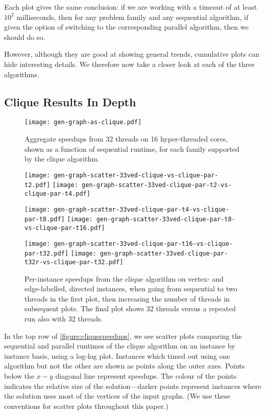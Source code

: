 \documentclass[sigconf]{acmart}
\begin{document}
Each plot gives the same conclusion: if we are working with a timeout of at least $10^2$
milliseconds, then for any problem family and any sequential algorithm, if given the option of
switching to the corresponding parallel algorithm, then we should do so.

However, although they are good at showing general trends, cumulative plots can hide interesting
details. We therefore now take a closer look at each of the three algorithms.

\subsection{Clique Results In Depth}

\begin{figure}[p]
    \texttt{[image: gen-graph-as-clique.pdf]}

    \caption{Aggregate speedups from 32 threads on 16 hyper-threaded cores, shown as a function of
    sequential runtime, for each family supported by the clique algorithm.}\label{figure:cliqueas}
\end{figure}
\begin{figure}[p]
    \texttt{[image: gen-graph-scatter-33ved-clique-vs-clique-par-t2.pdf]}
    \hfill
    \texttt{[image: gen-graph-scatter-33ved-clique-par-t2-vs-clique-par-t4.pdf]}

    \vspace*{1em}

    \texttt{[image: gen-graph-scatter-33ved-clique-par-t4-vs-clique-par-t8.pdf]}
    \hfill
    \texttt{[image: gen-graph-scatter-33ved-clique-par-t8-vs-clique-par-t16.pdf]}

    \vspace*{1em}

    \texttt{[image: gen-graph-scatter-33ved-clique-par-t16-vs-clique-par-t32.pdf]}
    \hfill
    \texttt{[image: gen-graph-scatter-33ved-clique-par-t32r-vs-clique-par-t32.pdf]}

    \caption{Per-instance speedups from the clique algorithm on vertex- and edge-labelled, directed
    instances, when going from sequential to two threads in the first plot, then increasing the
    number of threads in subsequent plots. The final plot shows 32 threads versus a repeated run
    also with 32 threads.}\label{figure:cliquescale}
\end{figure}

In the top row of \cref{figure:cliquespeedups}, we see scatter plots comparing the sequential and
parallel runtimes of the clique algorithm on an instance by instance basis, using a log-log plot.
Instances which timed out using one algorithm but not the other are shown as points along the outer
axes. Points below the $x{-}y$ diagonal line represent speedups. The colour of the points indicates
the relative size of the solution---darker points represent instances where the solution uses most
of the vertices of the input graphs. (We use these conventions for scatter plots throughout this
paper.)
\end{document}
